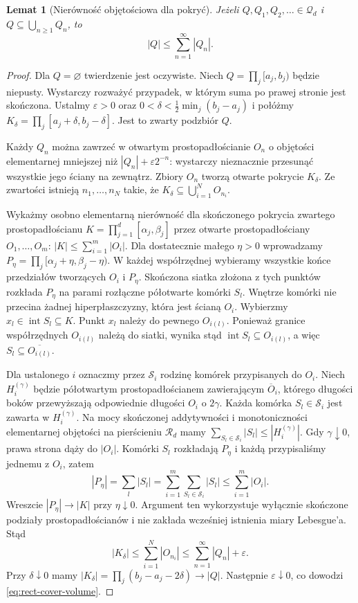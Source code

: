\documentclass[11pt,a4paper,oneside]{book}
\numberwithin{equation}{chapter}
\theoremstyle{plain}
\newtheorem{lemat}[twierdzenie]{Lemat}
\theoremstyle{definition}
\theoremstyle{remark}
\begin{document}
\begin{lemat}[Nierówność objętościowa dla pokryć]
\label{lem:rect-cover-ineq}
Jeżeli $Q,Q_1,Q_2,\ldots\in\mathcal Q_d$ i
$Q\subseteq\bigcup_{n\ge1}Q_n$, to
\begin{equation}\label{eq:rect-cover-volume}
|Q|\le\sum_{n=1}^\infty|Q_n|.
\end{equation}
\end{lemat}

\begin{proof}
Dla $Q=\varnothing$ twierdzenie jest oczywiste.
Niech $Q=\prod_j[a_j,b_j)$ będzie niepusty.
Wystarczy rozważyć przypadek, w którym suma po prawej
stronie jest skończona. Ustalmy $\varepsilon>0$ oraz
$0<\delta<\frac12\min_j(b_j-a_j)$ i połóżmy
$K_\delta=\prod_j[a_j+\delta,b_j-\delta]$.
Jest to zwarty podzbiór $Q$.

Każdy $Q_n$ można zawrzeć w otwartym prostopadłościanie
$O_n$ o objętości elementarnej mniejszej niż
$|Q_n|+\varepsilon2^{-n}$: wystarczy nieznacznie
przesunąć wszystkie jego ściany na zewnątrz.
Zbiory $O_n$ tworzą otwarte pokrycie $K_\delta$.
Ze zwartości istnieją $n_1,\ldots,n_N$ takie, że
$K_\delta\subseteq\bigcup_{i=1}^N O_{n_i}$.

Wykażmy osobno elementarną nierówność dla skończonego
pokrycia zwartego prostopadłościanu
$K=\prod_{j=1}^d[\alpha_j,\beta_j]$ przez otwarte
prostopadłościany $O_1,\ldots,O_m$:
$|K|\le\sum_{i=1}^m|O_i|$.
Dla dostatecznie małego $\eta>0$ wprowadzamy
$P_\eta=\prod_j[\alpha_j+\eta,\beta_j-\eta)$.
W każdej współrzędnej wybieramy wszystkie końce
przedziałów tworzących $O_i$ i $P_\eta$.
Skończona siatka złożona z tych punktów rozkłada
$P_\eta$ na parami rozłączne półotwarte komórki $S_l$.
Wnętrze komórki nie przecina żadnej hiperpłaszczyzny,
która jest ścianą $O_i$. Wybierzmy
$x_l\in\operatorname{int}S_l\subseteq K$.
Punkt $x_l$ należy do pewnego $O_{i(l)}$.
Ponieważ granice współrzędnych $O_{i(l)}$ należą do
siatki, wynika stąd
$\operatorname{int}S_l\subseteq O_{i(l)}$, a więc
$S_l\subseteq\overline{O_{i(l)}}$.

Dla ustalonego $i$ oznaczmy przez $\mathcal S_i$ rodzinę
komórek przypisanych do $O_i$. Niech $H_i^{(\gamma)}$
będzie półotwartym prostopadłościanem zawierającym
$\overline O_i$, którego długości boków przewyższają
odpowiednie długości $O_i$ o $2\gamma$.
Każda komórka $S_l\in\mathcal S_i$ jest zawarta w
$H_i^{(\gamma)}$. Na mocy skończonej addytywności
i monotoniczności elementarnej objętości na pierścieniu
$\mathcal R_d$ mamy
$\sum_{S_l\in\mathcal S_i}|S_l|
\le |H_i^{(\gamma)}|$.
Gdy $\gamma\downarrow0$, prawa strona dąży do $|O_i|$.
Komórki $S_l$ rozkładają $P_\eta$ i każdą przypisaliśmy
jednemu z $O_i$, zatem
\[
 |P_\eta|=\sum_l|S_l|
 =\sum_{i=1}^m\sum_{S_l\in\mathcal S_i}|S_l|
 \le\sum_{i=1}^m|O_i|.
\]
Wreszcie $|P_\eta|\to|K|$ przy $\eta\downarrow0$.
Argument ten wykorzystuje wyłącznie skończone podziały
prostopadłościanów i nie zakłada wcześniej istnienia miary
Lebesgue'a.
Stąd
\[
|K_\delta|\le\sum_{i=1}^N|O_{n_i}|
\le\sum_{n=1}^\infty|Q_n|+\varepsilon.
\]
Przy $\delta\downarrow0$ mamy
$|K_\delta|=\prod_j(b_j-a_j-2\delta)\to|Q|$.
Następnie $\varepsilon\downarrow0$, co dowodzi
\eqref{eq:rect-cover-volume}.
\end{proof}
\end{document}

